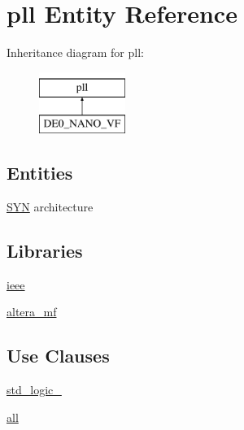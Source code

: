 \hypertarget{classpll}{}\section{pll Entity Reference}
\label{classpll}
Inheritance diagram for pll\+:\begin{figure}[H]
\begin{center}
\leavevmode
\includegraphics[height=2.000000cm]{classpll}
\end{center}
\end{figure}
\subsection*{Entities}
\begin{DoxyCompactItemize}
\item 
\hyperlink{classpll_1_1_s_y_n}{S\+Y\+N} architecture
\end{DoxyCompactItemize}
\subsection*{Libraries}
 \begin{DoxyCompactItemize}
\item 
\hyperlink{classpll_a0a6af6eef40212dbaf130d57ce711256}{ieee} 
\item 
\hyperlink{classpll_ad57cd8d31a38ff87ac163fb47757ffbf}{altera\+\_\+mf} 
\end{DoxyCompactItemize}
\subsection*{Use Clauses}
 \begin{DoxyCompactItemize}
\item 
\hyperlink{classpll_acd03516902501cd1c7296a98e22c6fcb}{std\+\_\+logic\+\_}   
\item 
\hyperlink{classpll_a470a86ce8776f637b0483eabf2d92ad2}{ all }   
\end{DoxyCompactItemize}
